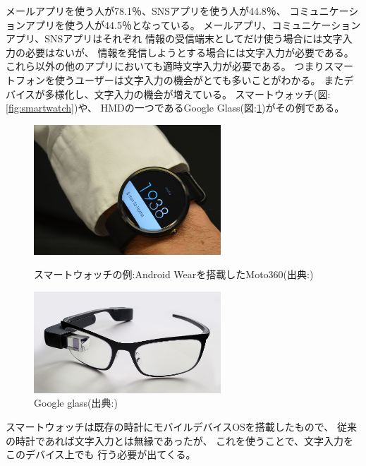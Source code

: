 メールアプリを使う人が78.1％、SNSアプリを使う人が44.8％、
コミュニケーションアプリを使う人が44.5％となっている。
メールアプリ、コミュニケーションアプリ、SNSアプリはそれぞれ
情報の受信端末としてだけ使う場合には文字入力の必要はないが、
情報を発信しようとする場合には文字入力が必要である。
これら以外の他のアプリにおいても適時文字入力が必要である。
つまりスマートフォンを使うユーザーは文字入力の機会がとても多いことがわかる。
またデバイスが多様化し、文字入力の機会が増えている。
スマートウォッチ(図:\ref{fig:smartwatch})や、
HMDの一つであるGoogle Glass(図:\ref{fig:googleglass})がその例である。
\begin{figure}[htbp]
  \begin{minipage}{0.5\hsize}
    \begin{center}
      \includegraphics[width=70mm,bb=0 0 246 171]{images/smartwatch.png}
    \end{center}
    \caption{スマートウォッチの例:Android Wearを搭載したMoto360(出典:\cite{smartwatch})}
    \label{fig:smartwatch}
  \end{minipage}
  \begin{minipage}{0.5\hsize}
    \begin{center}
      \includegraphics[width=70mm,bb=0 0 1280 697]{images/googleglass.png}
    \end{center}
    \caption{Google glass(出典:\cite{googleglass})}
    \label{fig:googleglass}
  \end{minipage}
\end{figure}
スマートウォッチは既存の時計にモバイルデバイスOSを搭載したもので、
従来の時計であれば文字入力とは無縁であったが、
これを使うことで、文字入力をこのデバイス上でも
行う必要が出てくる。


